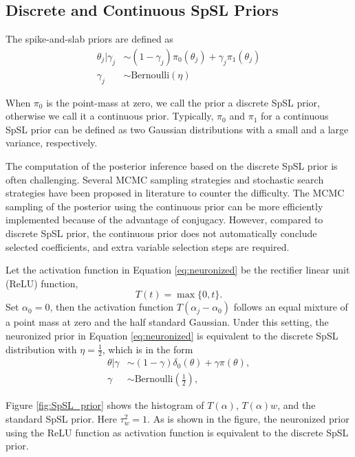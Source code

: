 \subsection{ Discrete and Continuous SpSL Priors}

The spike-and-slab priors \citep{mitchell1988bayesian,george1993variable} are defined as
\begin{align}
    \theta_j | \gamma_j &\sim (1-\gamma_j) \pi_0(\theta_j) + \gamma_j \pi_1(\theta_j) \\
    \gamma_j &\sim \text{Bernoulli}(\eta) \nonumber
\end{align}

When $\pi_0$ is the point-mass at zero, we call the prior a discrete SpSL prior, otherwise we call it a continuous prior. Typically, $\pi_0$ and $\pi_1$ for a continuous SpSL prior can be defined as two Gaussian distributions with a small and a large variance, respectively.

The computation of the posterior inference based on the discrete SpSL prior is often challenging. Several MCMC sampling strategies and stochastic search strategies have been proposed in literature to counter the difficulty. The MCMC sampling of the posterior using the continuous prior can be more efficiently implemented because of the advantage of conjugacy. However, compared to discrete SpSL prior, the continuous prior does not automatically conclude selected coefficients, and extra variable selection steps are required. 

Let the activation function in Equation \eqref{eq:neuronized} be the rectifier linear unit (ReLU) function,
$$ T(t) = \max \{0,t\}.$$
Set $\alpha_0 = 0$, then the activation function $T(\alpha_j - \alpha_0)$ follows an equal mixture of a point mass at zero and the half standard Gaussian. Under this setting, the neuronized prior in Equation \eqref{eq:neuronized} is equivalent to the discrete SpSL distribution with $\eta=\frac{1}{2}$, which is in the form
\begin{align}
    \theta | \gamma & \sim (1-\gamma) \delta_0(\theta) + \gamma \pi(\theta), \\
    \gamma &\sim \text{Bernoulli} (\frac{1}{2}), \nonumber
\end{align}

Figure \ref{fig:SpSL_prior} shows the histogram of $T(\alpha)$, $T(\alpha)w$, and the standard SpSL prior. Here $\tau_w^2 = 1$. As is shown in the figure, the neuronized prior using the ReLU function as activation function is equivalent to the discrete SpSL prior.

